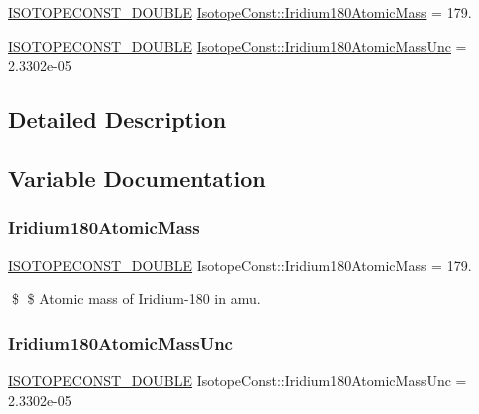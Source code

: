 \begin{DoxyCompactItemize}
\item 
\mbox{\hyperlink{group___isotope_const-_macros_ga8f45a7272ce02c0b4c65c44636ed719a}{I\+S\+O\+T\+O\+P\+E\+C\+O\+N\+S\+T\+\_\+\+D\+O\+U\+B\+LE}} \mbox{\hyperlink{group___isotope_const-_iridium-_ir180_gaef1c0cdb36485817198fa54a1af2187d}{Isotope\+Const\+::\+Iridium180\+Atomic\+Mass}} = 179.
\item 
\mbox{\hyperlink{group___isotope_const-_macros_ga8f45a7272ce02c0b4c65c44636ed719a}{I\+S\+O\+T\+O\+P\+E\+C\+O\+N\+S\+T\+\_\+\+D\+O\+U\+B\+LE}} \mbox{\hyperlink{group___isotope_const-_iridium-_ir180_ga93408cef50b14f47211bb2382a6a16f7}{Isotope\+Const\+::\+Iridium180\+Atomic\+Mass\+Unc}} = 2.\+3302e-\/05
\end{DoxyCompactItemize}


\subsection{Detailed Description}


\subsection{Variable Documentation}
\mbox{\label{group___isotope_const-_iridium-_ir180_gaef1c0cdb36485817198fa54a1af2187d}} 
\subsubsection{\texorpdfstring{Iridium180\+Atomic\+Mass}{Iridium180AtomicMass}}
{\footnotesize\ttfamily \mbox{\hyperlink{group___isotope_const-_macros_ga8f45a7272ce02c0b4c65c44636ed719a}{I\+S\+O\+T\+O\+P\+E\+C\+O\+N\+S\+T\+\_\+\+D\+O\+U\+B\+LE}} Isotope\+Const\+::\+Iridium180\+Atomic\+Mass = 179.}

\$ \$ Atomic mass of Iridium-\/180 in amu. \mbox{\label{group___isotope_const-_iridium-_ir180_ga93408cef50b14f47211bb2382a6a16f7}} 
\subsubsection{\texorpdfstring{Iridium180\+Atomic\+Mass\+Unc}{Iridium180AtomicMassUnc}}
{\footnotesize\ttfamily \mbox{\hyperlink{group___isotope_const-_macros_ga8f45a7272ce02c0b4c65c44636ed719a}{I\+S\+O\+T\+O\+P\+E\+C\+O\+N\+S\+T\+\_\+\+D\+O\+U\+B\+LE}} Isotope\+Const\+::\+Iridium180\+Atomic\+Mass\+Unc = 2.\+3302e-\/05}

